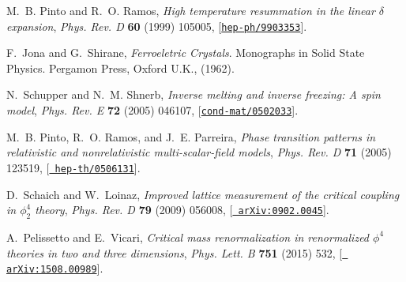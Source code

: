 \documentclass[a4paper,11pt]{article}
\begin{document}
\begin{thebibliography}{10}
M.~B. Pinto and R.~O. Ramos, {\it High temperature resummation in the linear
  $\delta$ expansion},  {\em Phys. Rev. D} {\bf 60} (1999) 105005,
  [\href{http://arxiv.org/abs/hep-ph/9903353}{{\tt hep-ph/9903353}}].

F.~Jona and G.~Shirane, {\em Ferroeletric Crystals}.
\newblock Monographs in Solid State Physics. Pergamon Press, Oxford U.K.,
  (1962).

N.~Schupper and N.~M. Shnerb, {\it Inverse melting and inverse freezing: A spin
  model},  {\em Phys. Rev. E} {\bf 72} (2005) 046107,
  [\href{http://arxiv.org/abs/cond-mat/0502033}{{\tt cond-mat/0502033}}].

M.~B. Pinto, R.~O. Ramos, and J.~E. Parreira, {\it Phase transition patterns in
  relativistic and nonrelativistic multi-scalar-field models},  {\em Phys. Rev.
  D} {\bf 71} (2005) 123519, [\href{http://arxiv.org/abs/hep-th/0506131}{{\tt
  hep-th/0506131}}].

D.~Schaich and W.~Loinaz, {\it Improved lattice measurement of the critical
  coupling in ${\ensuremath{\phi}}_{2}^{4}$ theory},  {\em Phys. Rev. D} {\bf
  79} (2009) 056008, [\href{http://arxiv.org/abs/0902.0045}{{\tt
  arXiv:0902.0045}}].

A.~Pelissetto and E.~Vicari, {\it Critical mass renormalization in renormalized
  $\phi^4$ theories in two and three dimensions},  {\em Phys. Lett. B} {\bf
  751} (2015) 532, [\href{http://arxiv.org/abs/1508.00989}{{\tt
  arXiv:1508.00989}}].

\end{thebibliography}\endgroup
\end{document}
